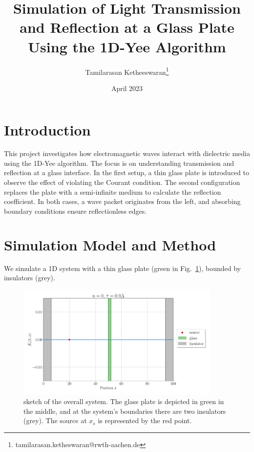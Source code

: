 \documentclass[11pt, A4paper]{article}
\title{Simulation of Light Transmission and Reflection at a Glass Plate Using the 1D-Yee Algorithm}
\author{Tamilarasan Ketheeswaran\footnote{tamilarasan.ketheswaran@rwth-aachen.de}}
\date{April 2023}
\begin{document}
\maketitle
\tableofcontents

\section{Introduction}
This project investigates how electromagnetic waves interact with dielectric media using the 1D-Yee algorithm. The focus is on understanding transmission and reflection at a glass interface. In the first setup, a thin glass plate is introduced to observe the effect of violating the Courant condition. The second configuration replaces the plate with a semi-infinite medium to calculate the reflection coefficient. In both cases, a wave packet originates from the left, and absorbing boundary conditions ensure reflectionless edges.

\clearpage



\section{Simulation Model and Method}

We simulate a 1D system with a thin glass plate (green in Fig.~\ref{fig: sketch}), bounded by insulators (grey). 

\begin{figure}[h!]%
         \centering
         \includegraphics[width=0.9\textwidth]{Plots/maxwell_tau0.9_thinglass_nmax0.pdf}
         \caption{sketch of the overall system. The glass plate is depicted in green in the middle, and  at the system's boundaries there are two insulators (grey). The source at $x_s$ is represented by the red point.}
         \label{fig: sketch}
\end{figure}
\end{document}
